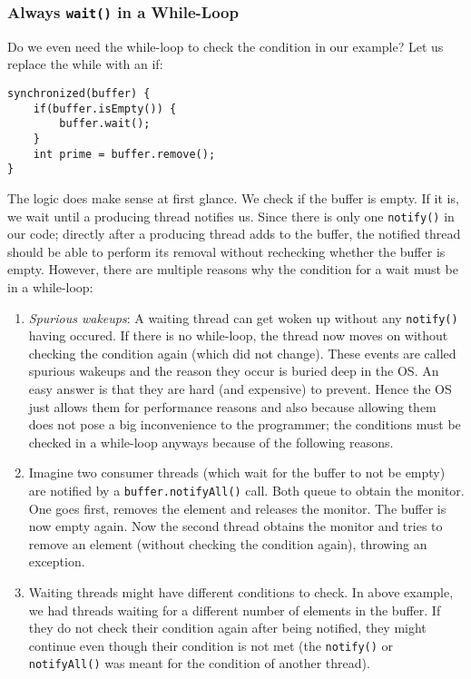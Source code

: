 \documentclass[main.tex]{subfiles}
\begin{document}
\subsubsection{Always \texttt{wait()} in a While-Loop}
Do we even need the while-loop to check the condition in our example? Let us replace the while with an if:
\begin{verbatim}
synchronized(buffer) {
    if(buffer.isEmpty()) {
        buffer.wait();
    }
    int prime = buffer.remove();
}
\end{verbatim}
The logic does make sense at first glance. We check if the buffer is empty. If it is, we wait until a producing thread notifies us. Since there is only one \texttt{notify()} in our code; directly after a producing thread adds to the buffer, the notified thread should be able to perform its removal without rechecking whether the buffer is empty. However, there are multiple reasons why the condition for a wait must be in a while-loop:
\begin{enumerate}
    \item \textit{Spurious wakeups}: A waiting thread can get woken up without any \texttt{notify()} having occured. If there is no while-loop, the thread now moves on without checking the condition again (which did not change). These events are called spurious wakeups and the reason they occur is buried deep in the OS. An easy answer is that they are hard (and expensive) to prevent. Hence the OS just allows them for performance reasons and also because allowing them does not pose a big inconvenience to the programmer; the conditions must be checked in a while-loop anyways because of the following reasons.
    \item Imagine two consumer threads (which wait for the buffer to not be empty) are notified by a \texttt{buffer.notifyAll()} call. Both queue to obtain the monitor. One goes first, removes the element and releases the monitor. The buffer is now empty again. Now the second thread obtains the monitor and tries to remove an element (without checking the condition again), throwing an exception.
    \item Waiting threads might have different conditions to check. In above example, we had threads waiting for a different number of elements in the buffer. If they do not check their condition again after being notified, they might continue even though their condition is not met (the \texttt{notify()} or \texttt{notifyAll()} was meant for the condition of another thread).
\end{enumerate}
\end{document}
